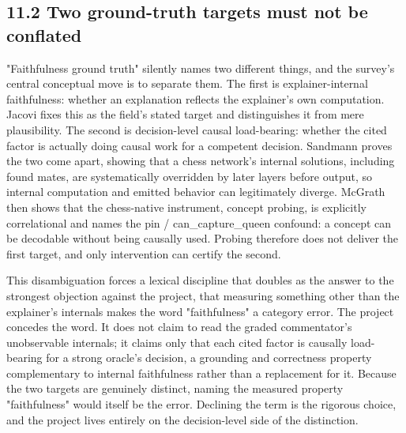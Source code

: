\documentclass[conference]{IEEEtran}
\begin{document}
\subsection*{11.2 Two ground-truth targets must not be conflated}
"Faithfulness ground truth" silently names two different things, and the survey's central conceptual move is to separate them. The first is explainer-internal faithfulness: whether an explanation reflects the explainer's own computation. Jacovi \cite{ref30} fixes this as the field's stated target and distinguishes it from mere plausibility. The second is decision-level causal load-bearing: whether the cited factor is actually doing causal work for a competent decision. Sandmann \cite{ref5} proves the two come apart, showing that a chess network's internal solutions, including found mates, are systematically overridden by later layers before output, so internal computation and emitted behavior can legitimately diverge. McGrath \cite{ref1} then shows that the chess-native instrument, concept probing, is explicitly correlational and names the pin / can\_capture\_queen confound: a concept can be decodable without being causally used. Probing therefore does not deliver the first target, and only intervention can certify the second.

This disambiguation forces a lexical discipline that doubles as the answer to the strongest objection against the project, that measuring something other than the explainer's internals makes the word "faithfulness" a category error. The project concedes the word. It does not claim to read the graded commentator's unobservable internals; it claims only that each cited factor is causally load-bearing for a strong oracle's decision, a grounding and correctness property complementary to internal faithfulness rather than a replacement for it. Because the two targets are genuinely distinct, naming the measured property "faithfulness" would itself be the error. Declining the term is the rigorous choice, and the project lives entirely on the decision-level side of the distinction.
\end{document}
